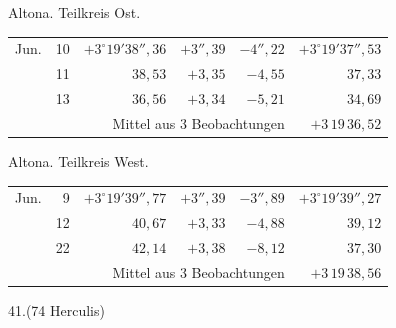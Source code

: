 \noindent\begin{minipage}[t]{.495\textwidth}\centering Altona. Teilkreis Ost.\par\smallskip
{\scriptsize\setlength{\tabcolsep}{1pt}\renewcommand{\arraystretch}{1.2}\begin{tabular}{lr|r|r|r|r|}
Jun.&10&$+3^\circ19'38''{,}36$&$+3''{,}39$&$-4''{,}22$&$+3^\circ19'37''{,}53$\\
&11&$38{,}53$&$+3{,}35$&$-4{,}55$&$37{,}33$\\
&13&$36{,}56$&$+3{,}34$&$-5{,}21$&$34{,}69$\\
\cline{6-6}\multicolumn{5}{r}{Mittel aus 3 Beobachtungen}&$+3\,19\,36{,}52$
\end{tabular}}\end{minipage}\hfill\begin{minipage}[t]{.495\textwidth}\centering Altona. Teilkreis West.\par\smallskip
{\scriptsize\setlength{\tabcolsep}{1pt}\renewcommand{\arraystretch}{1.2}\begin{tabular}{lr|r|r|r|r}
Jun.&9&$+3^\circ19'39''{,}77$&$+3''{,}39$&$-3''{,}89$&$+3^\circ19'39''{,}27$\\
&12&$40{,}67$&$+3{,}33$&$-4{,}88$&$39{,}12$\\
&22&$42{,}14$&$+3{,}38$&$-8{,}12$&$37{,}30$\\
\cline{6-6}\multicolumn{5}{r}{Mittel aus 3 Beobachtungen}&$+3\,19\,38{,}56$
\end{tabular}}\end{minipage}
\par\vspace{4mm}
\begin{center}41.\quad (74 Herculis)\end{center}


